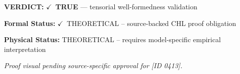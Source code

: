 \textbf{VERDICT:} \ensuremath{\checkmark}\ \textbf{TRUE} --- tensorial well-formedness validation

\textbf{Formal Status:} \ensuremath{\checkmark}\ THEORETICAL -- source-backed CHL proof obligation

\textbf{Physical Status:} THEORETICAL -- requires model-specific empirical interpretation
\par\vspace{0.45em}
\par
\vfill
\begingroup\footnotesize\itshape
Proof visual pending source-specific approval for [ID 0413].
\par\endgroup
\vfill
\endgroup
\endgroup

